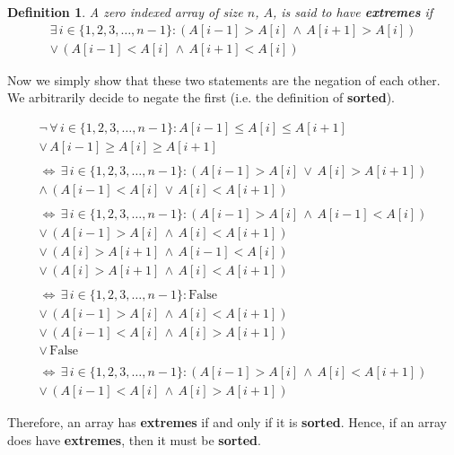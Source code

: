 \documentclass[12pt]{article}
\DeclareRobustCommand{\ul}[1]{%
	\uline{\phantom{#1}}%
	\llap{\contour{white}{#1}}%
}
\newtheorem*{definition}{Definition}
\begin{document}
\begin{definition}
  A zero indexed array of size $n$, $A$, is said to have
  \textbf{extremes} if
  \begin{align*}
    \exists \, i \in \{1,2,3,\ldots,n-1\} :
    (A[i-1] > A[i] \, \wedge \, A[i+1] > A[i]) \\ 
    \vee \,
    (A[i-1] < A[i] \, \wedge \, A[i+1] < A[i])
  \end{align*}
\end{definition}

Now we simply show that these two statements are the negation of
each other. We arbitrarily decide to negate the first (i.e. the
definition of \textbf{sorted}).

\begin{align*}
  \neg \, \forall \, i \in \{1,2,3,\ldots,n-1\} :
  A[i-1] \leq A[i] \leq A[i+1] \\
  \vee \,
  A[i-1] \geq A[i] \geq A[i+1] \\\\
  \Longleftrightarrow \, \exists \, i \in \{1,2,3,\ldots,n-1\} :
  (A[i-1] > A[i] \, \vee \, A[i] > A[i+1]) \\
  \wedge \,
  (A[i-1] < A[i] \, \vee \, A[i] < A[i+1]) \\\\
  \Longleftrightarrow \, \exists \, i \in \{1,2,3,\ldots,n-1\} :
  (A[i-1] > A[i] \, \wedge \, A[i-1] < A[i]) \\
  \vee \,
  (A[i-1] > A[i] \, \wedge \, A[i] < A[i+1]) \\
  \vee \,
  (A[i] > A[i + 1] \, \wedge \, A[i-1] < A[i]) \\
  \vee \,
  (A[i] > A[i + 1] \, \wedge \, A[i] < A[i+1]) \\\\
  \Longleftrightarrow \, \exists \, i \in \{1,2,3,\ldots,n-1\} :
  \text{False} \\
  \vee \,
  (A[i-1] > A[i] \, \wedge \, A[i] < A[i+1]) \\
  \vee \,
  (A[i-1] < A[i] \, \wedge \, A[i] > A[i + 1]) \\
  \vee \,
  \text{False} \\\\
  \Longleftrightarrow \, \exists \, i \in \{1,2,3,\ldots,n-1\} :
  (A[i-1] > A[i] \, \wedge \, A[i] < A[i+1]) \\
  \vee \,
  (A[i-1] < A[i] \, \wedge \, A[i] > A[i + 1])
\end{align*}

Therefore, an array has \textbf{extremes} if and only if it is
\ul{not} \textbf{sorted}. Hence, if an array does \ul{not} have
\textbf{extremes}, then it must be \textbf{sorted}.
\end{document}
